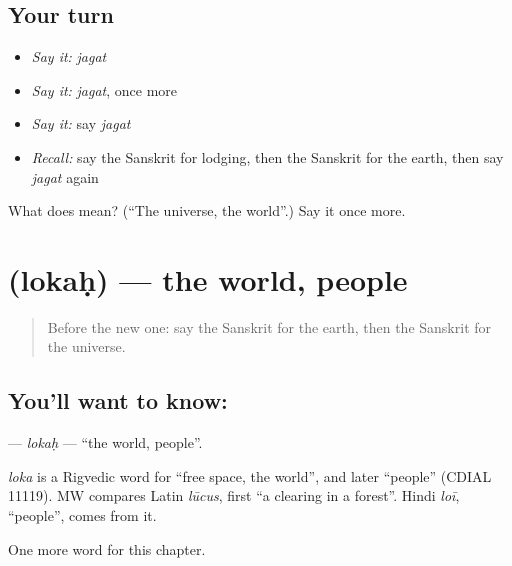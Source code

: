 \subsection*{Your turn}
\begin{itemize}
\raggedright
  \item \emph{Say it:} \emph{jagat}
  \item \emph{Say it:} \emph{jagat}, once more
  \item \emph{Say it:} say \emph{jagat}
  \item \emph{Recall:} say the Sanskrit for lodging, then the Sanskrit for the earth, then say \emph{jagat} again
\end{itemize}

\begin{tcolorbox}[breakable,colback=teal!4,colframe=teal!35!black,title={Before you move on}]
What does  mean? (\textquotedblleft{}The universe, the world\textquotedblright{}.) Say it once more.
\end{tcolorbox}
\section[\texorpdfstring{\sk{लोकः} (lokaḥ)}{लोकः (lokaḥ)}]{ (lokaḥ) — the world, people}

\label{lesson:SA-C251-lokah}



\begin{quote}
Before the new one: say the Sanskrit for the earth, then the Sanskrit for the universe.
\end{quote}

\subsection*{You'll want to know: }
\textbf{} — \emph{lokaḥ} — \textquotedblleft{}the world, people\textquotedblright{}.

\begin{cousinweb}
\emph{loka} is a Rigvedic word for \textquotedblleft{}free space, the world\textquotedblright{}, and later \textquotedblleft{}people\textquotedblright{} (CDIAL 11119). MW compares Latin \emph{lūcus}, first \textquotedblleft{}a clearing in a forest\textquotedblright{}. Hindi \emph{loī}, \textquotedblleft{}people\textquotedblright{}, comes from it.
\end{cousinweb}

\begin{grammarlens}[title={What you've built}]
One more word for this chapter.
\end{grammarlens}

